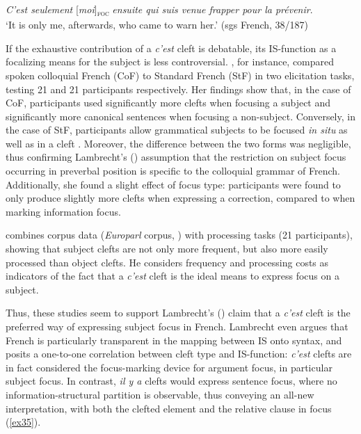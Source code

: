 \ea \label{ex34}
 \textit{C'est seulement} {[\textit{moi}]\textsubscript{\textsc{foc}}} \normalsize \textit{ensuite qui suis venue frapper pour la prévenir}.\\
`It is only me, afterwards, who came to warn her.' \hfill (sgs French, 38/187)   
\z


If the exhaustive contribution of a \textit{c'est} cleft is debatable, its IS-function as a focalizing means for the subject is less controversial.
\textcite{destruel2016focus}, for instance, compared spoken colloquial French (CoF) to Standard French (StF) in two elicitation tasks, testing 21 and 21 participants respectively. Her findings show that, in the case of CoF, participants used significantly more clefts when focusing a subject and significantly more canonical sentences when focusing a non-subject. Conversely, in the case of StF, participants  allow grammatical subjects to be focused \textit{in situ} as well as in a cleft \parencite{destruelFery2020_prominence_dualfocus, destruelLalandeChen2024_prosodic_focus}. Moreover, the difference between the two forms was negligible, thus confirming Lambrecht’s (\citeyear{lambrecht1996information}) assumption that the restriction on subject focus occurring in preverbal position is specific to the colloquial grammar of French.
Additionally, she found a slight effect of focus type: participants were found to only produce slightly more clefts when expressing a correction, compared to when marking information focus.

\textcite{reichle2014cleft} combines corpus data (\textit{Europarl} corpus, \cite{koehn2005europarl}) with processing tasks (21 participants), showing that subject clefts are not only more frequent, but also more easily processed than object clefts. He considers frequency and processing costs as indicators of the fact that a \textit{c’est} cleft is the ideal means to express focus on a subject.

Thus, these studies seem to support Lambrecht’s (\citeyear{lambrecht1996information}) claim  that a \textit{c’est} cleft is the preferred way of expressing subject focus in French.
Lambrecht even argues that French is particularly transparent in the mapping between IS onto syntax, and posits a one-to-one correlation between cleft type and IS-function: \textit{c’est} clefts are in fact considered the focus-marking device for argument focus, in particular subject focus. In contrast, \textit{il y a} clefts would express sentence focus, where no information-structural partition is observable, thus conveying an all-new interpretation, with both the clefted element and the relative clause in focus (\ref{ex35}). 

